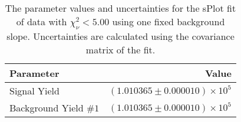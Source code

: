 
\begin{table}[ht]
    \begin{center}
        \begin{tabular}{lr}\toprule
            Parameter & Value \\\midrule
            Signal Yield & $(1.010365 \pm 0.000010) \times 10^{5}$ \\
            Background Yield $\#1$ & $(1.010365 \pm 0.000010) \times 10^{5}$ \\\bottomrule
        \end{tabular}
        \caption{The parameter values and uncertainties for the sPlot fit of data with $\chi^2_\nu < 5.00$ using one fixed background slope. Uncertainties are calculated using the covariance matrix of the fit.}\label{tab:splot-fit-results-chisqdof-5.00-fixed-1}
    \end{center}
\end{table}
